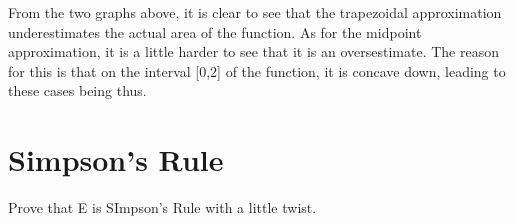 \documentclass[letterpaper,12pt]{article}
\theoremstyle{definition}
\begin{document}
\vspace{1cm}

From the two graphs above, it is clear to see that the trapezoidal approximation underestimates the actual area of the function. As for the midpoint approximation, it is a little harder to see that it is an oversestimate. The reason for this is that on the interval [0,2] of the function, it is concave down, leading to these cases being thus.

\pagebreak

\section{Simpson's Rule}

\begin{large}
  Prove that E is SImpson's Rule with a little twist.
\end{large}

\vspace{1cm}
\end{document}
